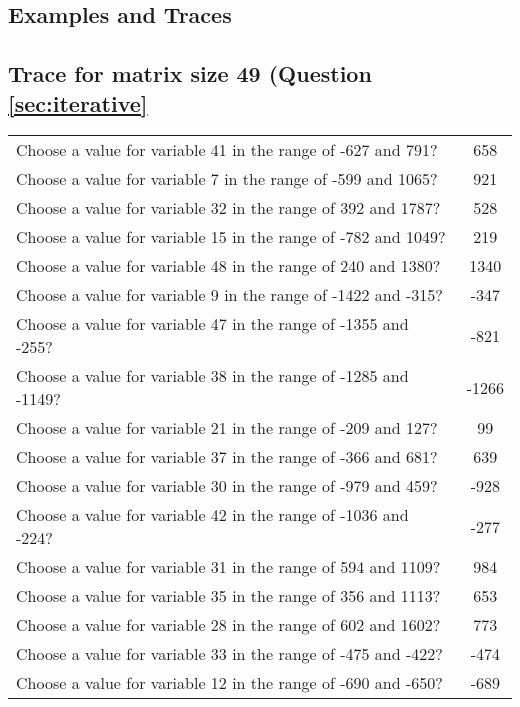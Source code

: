 \documentclass[10pt,a4paper]{article}
\begin{document}
\begin{appendix}
\section{Examples and Traces}
\phantom{*Easter Egg*}
\subsection{Trace for matrix size 49 (Question \ref{sec:iterative}}
\label{sec:app:iterative}
\begin{tabular}{ l  c }
Choose a value for variable 41 in the range of -627 and 791? & 658
\\Choose a value for variable 7 in the range of -599 and 1065? & 921
\\Choose a value for variable 32 in the range of 392 and 1787? & 528
\\Choose a value for variable 15 in the range of -782 and 1049? & 219
\\Choose a value for variable 48 in the range of 240 and 1380? & 1340
\\Choose a value for variable 9 in the range of -1422 and -315? & -347
\\Choose a value for variable 47 in the range of -1355 and -255? & -821
\\Choose a value for variable 38 in the range of -1285 and -1149? & -1266
\\Choose a value for variable 21 in the range of -209 and 127? & 99
\\Choose a value for variable 37 in the range of -366 and 681? & 639
\\Choose a value for variable 30 in the range of -979 and 459? & -928
\\Choose a value for variable 42 in the range of -1036 and -224? & -277
\\Choose a value for variable 31 in the range of 594 and 1109? & 984
\\Choose a value for variable 35 in the range of 356 and 1113? & 653
\\Choose a value for variable 28 in the range of 602 and 1602? & 773
\\Choose a value for variable 33 in the range of -475 and -422? & -474
\\Choose a value for variable 12 in the range of -690 and -650? & -689

\end{tabular}
\end{appendix}
\end{document}
